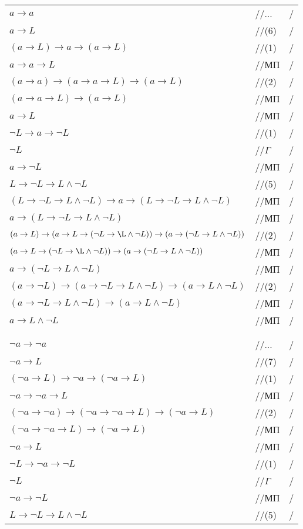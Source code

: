 \documentclass[12pt]{article}
\begin{document}
\begin{tabular*}{\textwidth}{l l l}
	$a\to a$ &//...&/\\
	$a\to L$ &//(6)&/\\
	$(a\to L)\to a\to(a\to L)$ &//(1)&/\\
	$a\to a\to L$ &//МП&/\\
	$(a\to a)\to(a\to a\to L)\to(a\to L)$ &//(2)&/\\
	$(a\to a\to L)\to(a\to L)$ &//МП&/\\
	$a\to L$ &//МП&/\\
	$\neg L\to a\to\neg L$ &//(1)&/\\
	$\neg L$ &//$\Gamma$&/\\
	$a\to\neg L$ &//МП&/\\
	$L\to\neg L\to L\wedge\neg L$ &//(5)&/\\
	$(L\to\neg L\to L\wedge\neg L)\to a\to(L\to\neg L\to L\wedge\neg L)$ &//МП&/\\
	$a\to(L\to\neg L\to L\wedge\neg L)$ &//МП&/\\
	$(a\to L)\to(a\to L\to(\neg L\to\L\wedge\neg L))\to(a\to(\neg L\to L\wedge\neg L))$ &//(2)&/\\
	$(a\to L\to(\neg L\to\L\wedge\neg L))\to(a\to(\neg L\to L\wedge\neg L))$ &//МП&/\\
	$a\to(\neg L\to L\wedge\neg L)$ &//МП&/\\
	$(a\to \neg L)\to(a\to \neg L\to L\wedge\neg L)\to(a\to L\wedge\neg L)$ &//(2)&/\\
	$(a\to \neg L\to L\wedge\neg L)\to(a\to L\wedge\neg L)$ &//МП&/\\
	$a\to L\wedge\neg L$ &//МП&/\\
	&&\\
	&&\\
	$\neg a\to \neg a$ &//...&/\\
	$\neg a\to L$ &//(7)&/\\
	$(\neg a\to L)\to \neg a\to(\neg a\to L)$ &//(1)&/\\
	$\neg a\to \neg a\to L$ &//МП&/\\
	$(\neg a\to \neg a)\to(\neg a\to \neg a\to L)\to(\neg a\to L)$ &//(2)&/\\
	$(\neg a\to \neg a\to L)\to(\neg a\to L)$ &//МП&/\\
	$\neg a\to L$ &//МП&/\\
	$\neg L\to \neg a\to\neg L$ &//(1)&/\\
	$\neg L$ &//$\Gamma$&/\\
	$\neg a\to\neg L$ &//МП&/\\
	$L\to\neg L\to L\wedge\neg L$ &//(5)&/\\

\end{tabular*}
\end{document}

